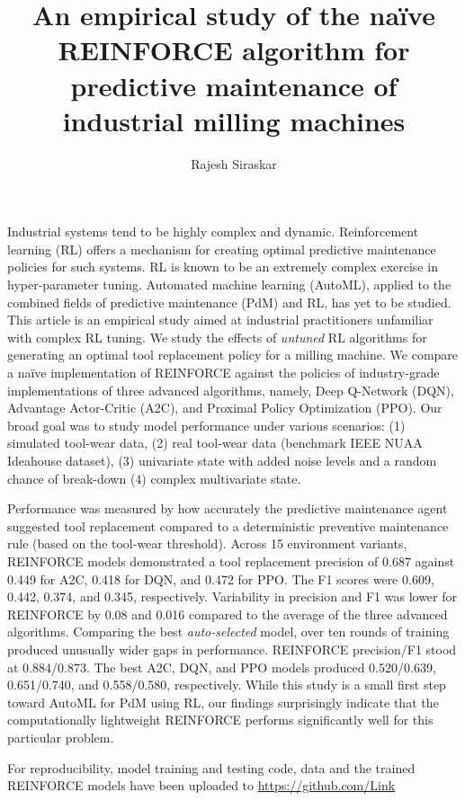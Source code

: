 \documentclass[a4paper, 12pt]{article}
\title{An empirical study of the na\"ive REINFORCE algorithm for predictive maintenance of industrial milling machines}
\author{Rajesh Siraskar}
\renewenvironment{abstract}
{\small
	\begin{center}
		\bfseries \abstractname\vspace{-.5em}\vspace{0pt}
	\end{center}
	\list{}{
		\setlength{\leftmargin}{.25cm}%
		\setlength{\rightmargin}{\leftmargin}%
	}%
	\item\relax}
{\endlist}
\begin{document}
\maketitle
\begin{abstract}
Industrial systems tend to be highly complex and dynamic. Reinforcement learning (RL) offers a mechanism for creating optimal predictive maintenance policies for such systems. RL is known to be an extremely complex exercise in hyper-parameter tuning. Automated machine learning (AutoML), applied to the combined fields of predictive maintenance (PdM) and RL, has yet to be studied. This article is an empirical study aimed at industrial practitioners unfamiliar with complex RL tuning. We study the effects of \textit{untuned} RL algorithms for generating an optimal tool replacement policy for a milling machine. We compare a na\"ive implementation of REINFORCE against the policies of industry-grade implementations of three advanced algorithms, namely, Deep Q-Network (DQN), Advantage Actor-Critic (A2C), and Proximal Policy Optimization (PPO). Our broad goal was to study model performance under various scenarios: (1) simulated tool-wear data, (2) real tool-wear data  (benchmark IEEE NUAA Ideahouse dataset), (3) univariate state with added noise levels and a random chance of break-down (4) complex multivariate state.

Performance was measured by how accurately the predictive maintenance agent suggested tool replacement compared to a deterministic preventive maintenance rule (based on the tool-wear threshold). Across 15 environment variants, REINFORCE models demonstrated a tool replacement precision of 0.687 against 0.449 for A2C, 0.418 for DQN, and 0.472 for PPO. The F1 scores were 0.609, 0.442, 0.374, and 0.345, respectively. Variability in precision and F1 was lower for REINFORCE by 0.08 and 0.016 compared to the average of the three advanced algorithms. Comparing the best \textit{auto-selected} model, over ten rounds of training produced unusually wider gaps in performance. REINFORCE precision/F1 stood at 0.884/0.873. The best A2C, DQN, and PPO models produced 0.520/0.639, 0.651/0.740, and 0.558/0.580, respectively. While this study is a small first step toward AutoML for PdM using RL, our findings surprisingly indicate that the computationally lightweight REINFORCE performs significantly well for this particular problem.

For reproducibility, model training and testing code, data and the trained REINFORCE models have been uploaded to \href{https://github.com/Rajesh-Siraskar/Empirical-Study\_REINFORCE-for-predictive-maintenance}{https://github.com/Link} 
\end{abstract}
\end{document}
